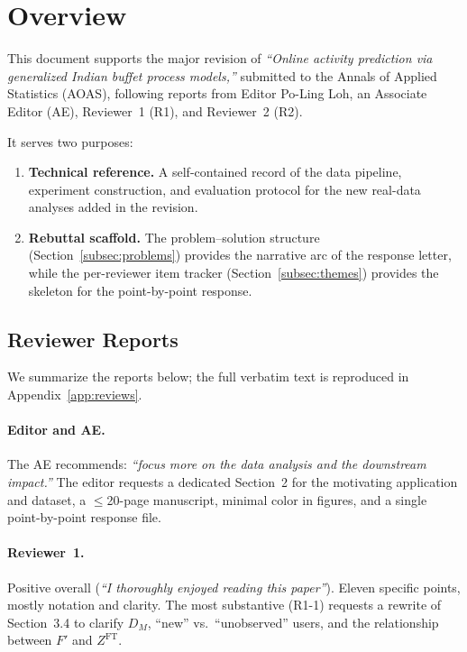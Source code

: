 \section{Overview}
\label{sec:overview}

This document supports the major revision of
\emph{``Online activity prediction via generalized Indian buffet
process models,''} submitted to the Annals of Applied Statistics
(AOAS), following reports from Editor Po-Ling Loh, an Associate
Editor (AE), Reviewer~1 (R1), and Reviewer~2 (R2).

It serves two purposes:
\begin{enumerate}[leftmargin=*]
  \item \textbf{Technical reference.}
        A self-contained record of the data pipeline, experiment
        construction, and evaluation protocol for the new real-data
        analyses added in the revision.
  \item \textbf{Rebuttal scaffold.}
        The problem--solution structure (Section~\ref{subsec:problems})
        provides the narrative arc of the response letter, while the
        per-reviewer item tracker (Section~\ref{subsec:themes})
        provides the skeleton for the point-by-point response.
\end{enumerate}


\subsection{Reviewer Reports}
\label{subsec:reviewer_reports}

We summarize the reports below; the full verbatim text is
reproduced in Appendix~\ref{app:reviews}.

\paragraph{Editor and AE.}
The AE recommends: \emph{``focus more on the data analysis and the
downstream impact.''}
The editor requests a dedicated Section~2 for the motivating
application and dataset, a $\leq$20-page manuscript, minimal color
in figures, and a single point-by-point response file.

\paragraph{Reviewer~1.}
Positive overall (\emph{``I thoroughly enjoyed reading this paper''}).
Eleven specific points, mostly notation and clarity.
The most substantive (R1-1) requests a rewrite of Section~3.4
to clarify $D_M$, ``new'' vs.\ ``unobserved'' users, and the
relationship between $F'$ and $Z^{\mathrm{FT}}$.

